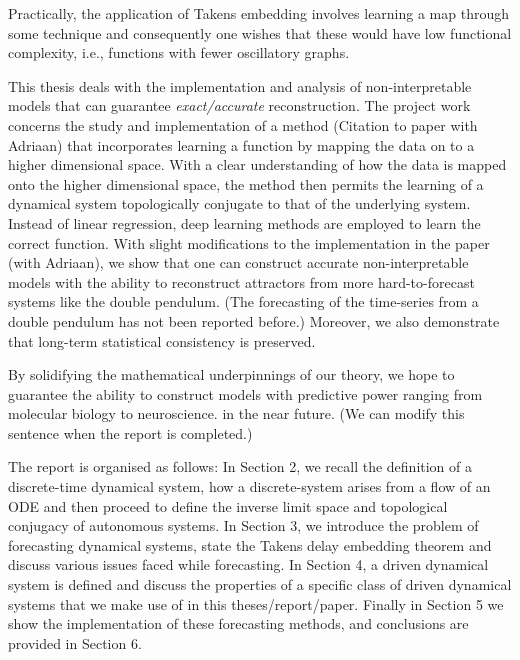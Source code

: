 \documentclass[12 pt]{article}
\begin{document}
Practically, the application of Takens embedding involves learning a map through some technique and consequently one wishes that these would have low functional complexity\cite{manjunath2021universal}, i.e., functions with fewer oscillatory graphs.

This thesis deals with the implementation and analysis of non-interpretable models that can guarantee \emph{exact/accurate} reconstruction. The project work concerns the study and implementation of a method (Citation to paper with Adriaan) that incorporates learning a function by mapping the data on to a higher dimensional space. With a clear understanding of how the data is mapped onto the higher dimensional space, the method then permits the learning of a dynamical system topologically conjugate to that of the underlying system. Instead of linear regression, deep learning methods are employed to learn the correct function. With slight modifications to the implementation in the paper (with Adriaan), we show that one can construct accurate non-interpretable models with the ability to reconstruct attractors from more hard-to-forecast systems like the double pendulum. (The forecasting of the time-series from a double pendulum has not been reported before.) Moreover, we also demonstrate that long-term statistical consistency is preserved.

By solidifying the mathematical underpinnings of our theory, we hope to guarantee the ability to construct models with predictive power ranging from molecular biology to neuroscience. in the near future. (We can modify this sentence when the report is completed.)

The report is organised as follows: 
\newline In Section 2, we recall the definition of a discrete-time dynamical system, how a discrete-system arises from a flow of an ODE and then proceed to define the inverse limit space and topological conjugacy of autonomous systems. 
\newline In Section 3, we introduce the problem of forecasting dynamical systems, state the Takens delay embedding theorem and discuss various issues faced while forecasting. 
\newline In Section 4, a driven dynamical system is defined and discuss the properties of a specific class of driven dynamical systems that we make use of in this theses/report/paper. 
\newline Finally in Section 5 we show the implementation of these forecasting methods, and conclusions are provided in Section 6.
\end{document}
